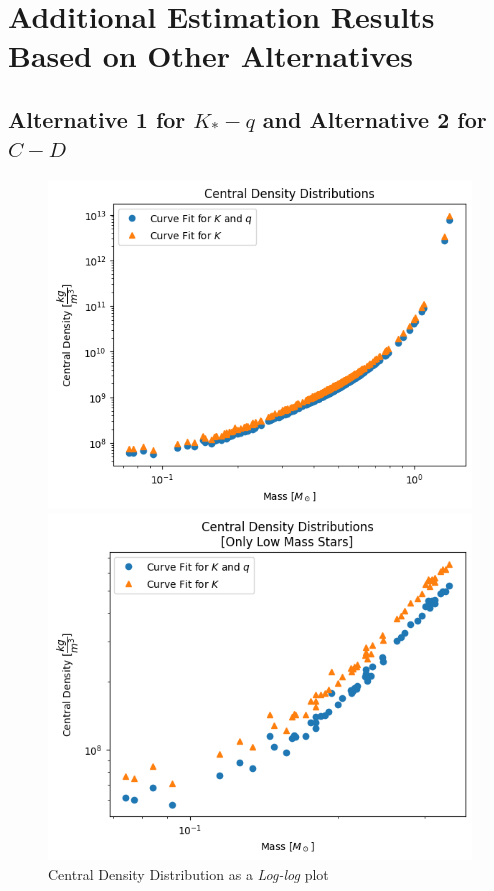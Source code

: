 \documentclass[letterpaper,12pt]{article}
\begin{document}
\appendix
\section{Additional Estimation Results Based on Other Alternatives}
\label{appendix}
\subsection{Alternative 1 for $K_* - q$ and Alternative 2 for $C-D$}


\begin{figure}[H]
\begin{minipage}{.5\textwidth}
\centerline{\includegraphics[width=\linewidth]{figures/appendix/1_2_1_n_ll_rho_m.png}}
\end{minipage}
\begin{minipage}{.5\textwidth}
\centerline{\includegraphics[width=\linewidth]{figures/appendix/1_2_2_n_ll_rho_m_.png}}
\end{minipage}
\caption{Central Density Distribution as a \textit{Log-log} plot}
\end{figure}
\end{document}
